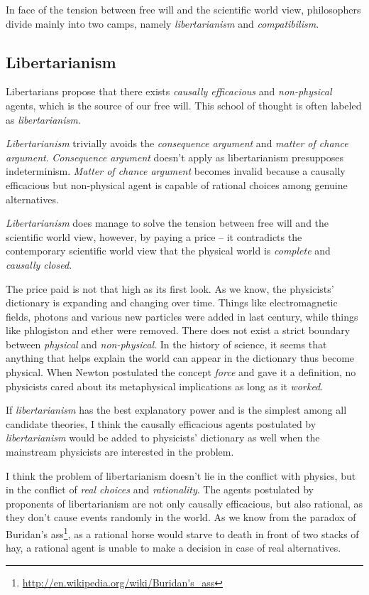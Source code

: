 In face of the tension between free will and the scientific world view, philosophers divide mainly into two camps, namely \emph{libertarianism} and \emph{compatibilism}.

\subsection{Libertarianism}

Libertarians propose that there exists \emph{causally efficacious} and \emph{non-physical} agents, which is the source of our free will. This school of thought is often labeled as \emph{libertarianism}.

\emph{Libertarianism} trivially avoids the \emph{consequence argument} and \emph{matter of chance argument}. \emph{Consequence argument} doesn't apply as libertarianism presupposes indeterminism. \emph{Matter of chance argument} becomes invalid because a causally efficacious but non-physical agent is capable of rational choices among genuine alternatives.

\emph{Libertarianism} does manage to solve the tension between free will and the scientific world view, however, by paying a price -- it contradicts the contemporary scientific world view that the physical world is \emph{complete} and \emph{causally closed}.

The price paid is not that high as its first look. As we know, the physicists' dictionary is expanding and changing over time. Things like electromagnetic fields, photons and various new particles were added in last century, while things like phlogiston and ether were removed. There does not exist a strict boundary between \emph{physical} and \emph{non-physical}. In the history of science, it seems that anything that helps explain the world can appear in the dictionary thus become physical. When Newton postulated the concept \emph{force} and gave it a definition, no physicists cared about its metaphysical implications as long as it \emph{worked}.

If \emph{libertarianism} has the best explanatory power and is the simplest among all candidate theories, I think the causally efficacious agents postulated by \emph{libertarianism} would be added to physicists' dictionary as well when the mainstream physicists are interested in the problem.

\iffalse
I think the problem of libertarianism doesn't lie in the conflict with physics, but in the conflict of \emph{real choices} and \emph{rationality}. The agents postulated by proponents of libertarianism are not only causally efficacious, but also rational, as they don't cause events randomly in the world. As we know from the paradox of Buridan's ass\footnote{\url{http://en.wikipedia.org/wiki/Buridan's_ass}}, as a rational horse would starve to death in front of two stacks of hay, a rational agent is unable to make a decision in case of real alternatives.

